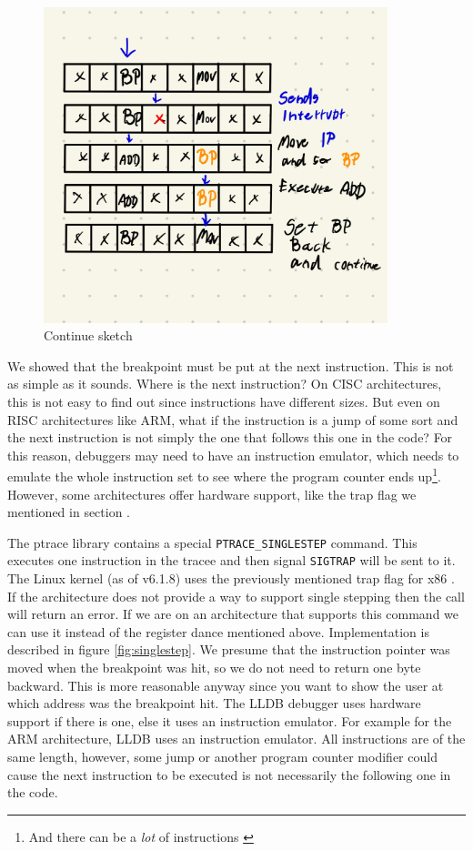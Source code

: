 \begin{figure}\label{fig:continue}
    \centering
    \includegraphics[width=100mm,scale=0.5]{media/breakpoint_tbd}
    \caption{Continue sketch}
\end{figure}

We showed that the breakpoint must be put at the next instruction. This is not
as simple as it sounds. Where is the next instruction? On CISC architectures,
this is not easy to find out since instructions have different sizes. But even
on RISC architectures like ARM, what if the instruction is a jump of some sort
and the next instruction is not simply the one that follows this one in the
code? For this reason, debuggers may need to have an instruction emulator,
which needs to emulate the whole instruction set to see where the program
counter ends up\footnote{And there can be a \textit{lot} of instructions
\cite{intel-manual}}. However, some architectures offer hardware support, like
the trap flag we mentioned in section .

The ptrace library contains a special \texttt{PTRACE\_SINGLESTEP} command. This
executes one instruction in the tracee and then signal \texttt{SIGTRAP} will be
sent to it. The Linux kernel (as of v6.1.8) uses the previously mentioned trap
flag for x86 \cite{linuxkernel-trapflag}. If the architecture does not provide
a way to support single stepping then the call will return an error. If we are
on an architecture that supports this command we can use it instead of the
register dance mentioned above. Implementation is described in figure
\ref{fig:singlestep}. We presume that the instruction pointer was moved when
the breakpoint was hit, so we do not need to return one byte backward. This is
more reasonable anyway since you want to show the user at which address was the
breakpoint hit. The LLDB \cite{lldb} debugger uses hardware support if there is
one, else it uses an instruction emulator. For example for the ARM
architecture, LLDB uses an instruction emulator. All instructions are of the
same length, however, some jump or another program counter modifier could cause
the next instruction to be executed is not necessarily the following one in the
code.

